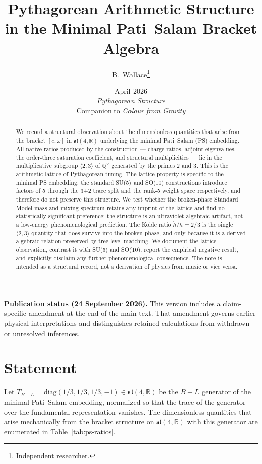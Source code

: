 \documentclass[11pt]{article}
\title{Pythagorean Arithmetic Structure in the Minimal Pati--Salam
Bracket Algebra}
\author{B.~Wallace\thanks{Independent researcher.}}
\date{April 2026 \\ \textit{Pythagorean Structure} \\
Companion to \textit{Colour from Gravity}}
\theoremstyle{plain}
\theoremstyle{remark}
\newcommand{\sln}[1]{\mathfrak{sl}(#1,\mathbb{R})}
\newcommand{\TBL}{T_{B\!-\!L}}
\begin{document}
\maketitle

\begin{abstract}
We record a structural observation about the dimensionless quantities
that arise from the bracket $[e,\omega]$ in $\sln{4}$ underlying the
minimal Pati--Salam (PS) embedding.  All native ratios produced by
the construction --- charge ratios, adjoint eigenvalues, the
order-three saturation coefficient, and structural multiplicities
--- lie in the multiplicative subgroup $\langle 2, 3 \rangle$ of
$\mathbb{Q}^\times$ generated by the primes 2 and 3.  This is the
arithmetic lattice of Pythagorean tuning.  The lattice property is
specific to the minimal PS embedding: the standard SU(5) and SO(10)
constructions introduce factors of 5 through the 3+2 trace split and
the rank-5 weight space respectively, and therefore do not preserve
this structure.  We test whether the broken-phase Standard Model
mass and mixing spectrum retains any imprint of the lattice and
find no statistically significant preference: the structure is an
ultraviolet algebraic artifact, not a low-energy phenomenological
prediction.  The Koide ratio $\tilde h/h = 2/3$ is the single
$\langle 2, 3 \rangle$ quantity that does survive into the broken
phase, and only because it is a derived algebraic relation
preserved by tree-level matching.  We document the lattice
observation, contrast it with SU(5) and SO(10), report the
empirical negative result, and explicitly disclaim any further
phenomenological consequence.  The note is intended as a
structural record, not a derivation of physics from music or
vice versa.
\end{abstract}
\par\smallskip\noindent\textbf{Publication status (24 September 2026).}
This version includes a claim-specific amendment at the end of the main text.
That amendment governs earlier physical interpretations and distinguishes
retained calculations from withdrawn or unresolved inferences.\par\smallskip


\section{Statement}

Let $\TBL = \mathrm{diag}(1/3, 1/3, 1/3, -1) \in \sln{4}$ be the
$B-L$ generator of the minimal Pati--Salam embedding, normalized so
that the trace of the generator over the fundamental representation
vanishes.  The dimensionless quantities that arise mechanically from
the bracket structure on $\sln{4}$ with this generator are
enumerated in Table~\ref{tab:ps-ratios}.
\end{document}
